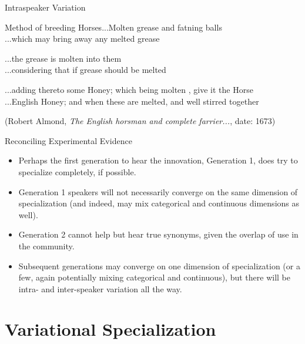 \documentclass[hyperref={pdfpagelabels=false}]{beamer}
\begin{document}
\begin{frame}{Intraspeaker Variation}
		\begin{exe}
			\ex \begin{xlist} \ex Method of breeding Horses...Molten grease and fatning balls\\
			\ex ...which may bring away any melted grease\\
			\end{xlist}
			\ex \begin{xlist} \ex ...the grease is molten into them\\
			\ex ...considering that if grease should be melted\\
			\end{xlist}
			\ex \begin{xlist} \ex...adding thereto some Honey; which being molten , give it the Horse\\
			\ex ...English Honey; and when these are melted, and well stirred together\\
			\end{xlist}
		\end{exe}
		(Robert Almond, \textsl{The English horsman and complete farrier...}, date: 1673)
\end{frame}


\begin{frame}{Reconciling Experimental Evidence}
		\begin{itemize}
			\item Perhaps the first generation to hear the innovation, Generation 1, does try to specialize completely, if possible.
			\item Generation 1 speakers will not necessarily converge on the same dimension of specialization (and indeed, may mix categorical and continuous dimensions as well).
			\item Generation 2 cannot help but hear true synonyms, given the overlap of use in the community.
			\item Subsequent generations may converge on one dimension of specialization (or a few, again potentially mixing categorical and continuous), but there will be intra- and inter-speaker variation all the way.
		\end{itemize}
\end{frame}


\section{Variational Specialization}
\end{document}
